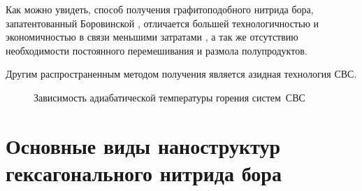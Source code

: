 Как можно увидеть, способ получения графитоподобного нитрида бора,
запатентованный Боровинской \cite[]{__1999}, отличается большей технологичностью
и экономичностью в связи меньшими затратами , а так же отсутствию необходимости
постоянного перемешивания и размола полупродуктов.

Другим распространенным методом получения является азидная технология СВС.



\begin{figure}[ht]

 \caption{Зависимость адиабатической температуры горения систем~СВС}\label{fig:BN-SHS}
\end{figure}





\section{Основные виды наноструктур гексагонального нитрида бора}%
\label{sec:Основные виды наноструктур гексагонального нитрида бора}

\cite[]{amos} 

